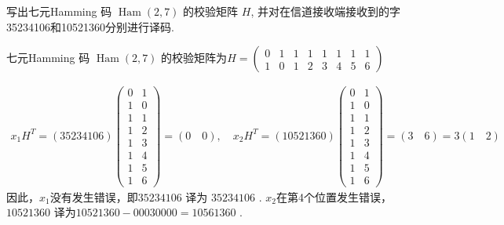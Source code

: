   \begin{tcolorbox}[breakable,colback=blue!5!white,colframe=blue!75!black,
 title= 解答题]

 写出七元Hamming 码 $ \operatorname{Ham}(2,7) $ 的校验矩阵 $ H $, 并对在信道接收端接收到的字35234106和10521360分别进行译码.
 \tcblower

七元Hamming 码 $ \operatorname{Ham}(2,7) $ 的校验矩阵为$H=\left(\begin{array}{llllllll}
0 & 1 & 1 & 1 & 1 & 1 & 1 & 1 \\
1 & 0 & 1 & 2 & 3 & 4 & 5 & 6
\end{array}\right) $

$$
\begin{array}{c}
x_1H^{T}= (35234106) \left(\begin{array}{ll}
0 & 1 \\
1 & 0 \\
1 & 1 \\
1 & 2 \\
1 & 3 \\
1 & 4 \\
1 & 5 \\
1 & 6
\end{array}\right)=(0\quad0),\quad x_2H^{T}= (10521360)\left(\begin{array}{ll}
0 & 1 \\
1 & 0 \\
1 & 1 \\
1 & 2 \\
1 & 3 \\
1 & 4 \\
1 & 5 \\
1 & 6
\end{array}\right)=(3\quad6)=3 (1\quad2)
\end{array}
$$
因此，$x_1$没有发生错误，即$35234106$ 译为 $35234106$ . $x_2$在第4个位置发生错误，$10521360$ 译为$10521360-00030000= 10561360$ .
 \end{tcolorbox}


